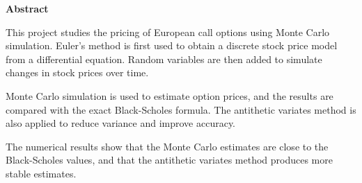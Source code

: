 \begin{center}
	{\Huge \textbf{Abstract}}
	\vspace{1cm}
\end{center}
This project studies the pricing of European call options using Monte Carlo simulation.  Euler's method is first used to obtain a discrete stock price model from a differential equation. Random variables are then added to simulate changes in stock prices over time.

Monte Carlo simulation is used to estimate option prices, and the results are compared with the exact Black-Scholes formula. The antithetic variates method is also applied to reduce variance and improve accuracy.

The numerical results show that the Monte Carlo estimates are close to the Black-Scholes values, and that the antithetic variates method produces more stable estimates.